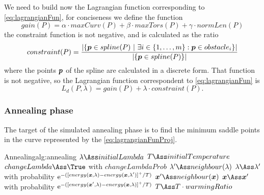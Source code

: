 \documentclass[dissertation.tex]{subfiles}
\begin{document}
We need to build now the Lagrangian function corresponding to
\cref{eq:lagrangianFun}, for conciseness we define the function
\begin{equation*}
  gain(P) = \alpha\cdot maxCurv(P)+\beta\cdot
    maxTors(P)+\gamma\cdot normLen(P)
\end{equation*}
the constraint function is not negative, and is calculated as the
ratio
\begin{equation*}
constraint(P) = \frac{|\{\boldsymbol{p} \in spline(P)\ |\ \exists i\in\{1,\dots,m\}
  : \boldsymbol{p}\in obstacle_i \}|}{|\{\boldsymbol{p} \in spline(P)\}|}
\end{equation*}
where the points $\boldsymbol{p}$ of the spline are calculated in a discrete form. That
function is not negative, so the Lagrangian function correspondent to
\cref{eq:lagrangianFun} is
\begin{equation}\label{eq:lagrangianFunProj}
    L_d(P,\lambda)=gain(P)+\lambda\cdot constraint(P).
\end{equation}

\subsubsection{Annealing phase}
The target of the simulated annealing phase is to find the minimum
saddle points in
the curve represented by the
\cref{eq:lagrangianFunProj}.
\begin{algo}{Annealing}{alg:annealing}
  \State $\lambda\Ass initialLambda$\label{alg:annealing:initialize}
  \State $T\Ass initialTemperature$
  \label{alg:annealing:while}
  \label{alg:annealing:for}
  \State $changeLambda\Ass\True$ with $changeLambdaProb$\label{alg:annealing:lambdaProb}
  \State $\lambda'\Ass neighbour(\lambda)$\label{alg:annealing:changeLambda}
  \State $\lambda\Ass \lambda'$ with probability $\mathrm{e}^{-([energy(\boldsymbol{x},\lambda)-energy(\boldsymbol{x},\lambda')]^+/T)}$
  \Else
  \State $\ve{x}'\Ass neighbour(\ve{x})$\label{alg:annealing:changeX}
  \State $\ve{x}\Ass \ve{x}'$ with probability $\mathrm{e}^{-([energy(\boldsymbol{x}',\lambda)-energy(\boldsymbol{x},\lambda)]^+/T)}$
  \EndIf
  \EndFor
  \State $T\Ass T\cdot warmingRatio$\label{alg:annealing:cooling}
  \EndWhile
  \EndProcedure
\end{algo}
\end{document}
